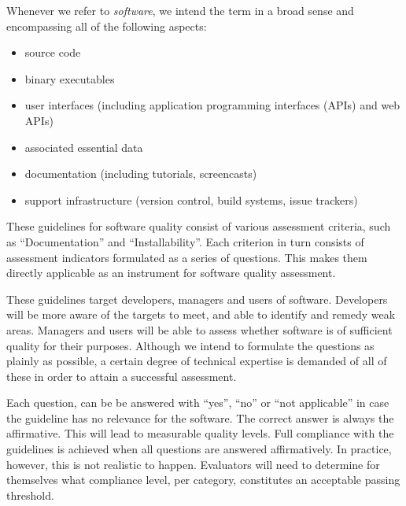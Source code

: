 \documentclass[a4paper,11pt]{article}
\begin{document}
Whenever we refer to \emph{software}, we intend the term in a broad sense and
encompassing all of the following aspects:
\begin{itemize}
    \item source code
    \item binary executables
    \item user interfaces (including application programming interfaces (APIs) and web APIs)
    \item associated essential data
%
%
%
    \item documentation (including tutorials, screencasts)
    \item support infrastructure (version control, build systems, issue trackers)
\end{itemize}

These guidelines for software quality consist of various assessment
criteria, such as ``Documentation'' and ``Installability''. Each criterion in turn
consists of assessment indicators formulated as a series of questions. This
makes them directly applicable as an instrument for software quality
assessment. 

These guidelines target developers, managers and users of software.
Developers will be more aware of the targets to meet, and able to identify and
remedy weak areas. Managers and users will be able to assess whether software
is of sufficient quality for their purposes. Although we intend to
formulate the questions as plainly as possible, a certain degree of technical
expertise is demanded of all of these in order to attain a successful
assessment.

Each question, can be be answered with ``yes'', ``no'' or ``not applicable'' in
case the guideline has no relevance for the software. The correct answer is
always the affirmative. This will lead to measurable quality levels. Full
compliance with the guidelines is achieved when all questions are answered
affirmatively.  In practice, however, this is not realistic to happen.
Evaluators will need to determine for themselves what compliance level, per
category, constitutes an acceptable passing threshold.
\end{document}
